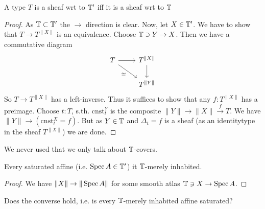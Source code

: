 \documentclass{article}
\begin{document}
\begin{lemma}
    A type $T$ is a sheaf wrt to $\mathbb{T}'$ iff it is a sheaf wrt to $\mathbb{T}$
\end{lemma}
\begin{proof}
    As $\mathbb{T} \subset \mathbb{T}'$ the $\rightarrow$ direction is clear. Now, let $X \in \mathbb{T}'$. We have to show that $T \to T^{\|X\|}$ is an equivalence. Choose $\mathbb{T} \ni Y \to X$. Then we have a commutative diagram
\[\begin{tikzcd}
	T & {T^{\|X\|}} \\
	& {T^{\|Y\|}}
	\arrow[from=1-1, to=1-2]
	\arrow["\simeq"', from=1-1, to=2-2]
	\arrow[from=1-2, to=2-2]
\end{tikzcd}\]
So $T \to T^{\|X\|}$ has a left-inverse. Thus it suffices to show that any $f : T^{\|X\|}$ has a preimage. Choose $t : T$, s.th. $\mathrm{cnst}^Y_t$ is the composite $\|Y\| \to \|X\| \overset{f}{\to} T$. We have $\|Y\| \to (\mathrm{cnst}^X_t = f)$. But as $Y \in \mathbb{T}$ and $\Delta_t = f$ is a sheaf (as an identitytype in the sheaf $T^{\|X\|}$) we are done.
\end{proof}
\begin{rmk}
    We never used that we only talk about $\mathbb{T}$-covers.
\end{rmk}
\begin{lemma}
Every saturated affine (i.e. $\operatorname{Spec} A \in \mathbb{T}'$) it $\mathbb{T}$-merely inhabited.     
\end{lemma}
\begin{proof}
    We have $\|X\| \to \|\operatorname{Spec} A\|$ for some smooth atlas $\mathbb{T} \ni X \to \operatorname{Spec} A$.
\end{proof}

\begin{question}
    Does the converse hold, i.e. is every $\mathbb{T}$-merely inhabited affine saturated?    
\end{question}
\end{document}
